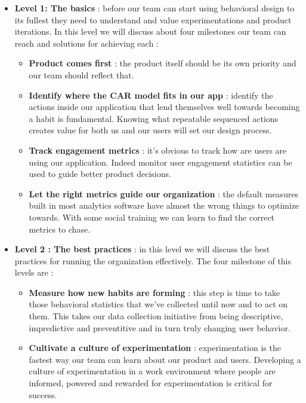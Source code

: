 \documentclass[11pt]{article}
\begin{document}
\begin{itemize}
\item \textbf{Level 1: The basics} : before our team can start using behavioral design to its fullest they need to understand and value experimentations and product iterations. In this level we will discuss about four milestones our team can reach and solutions for achieving each :
\begin{itemize}
\item \textbf{Product comes first} : the product itself should be its own priority and our team should reflect that.

\item \textbf{Identify where the CAR model fits in our app} : identify the actions inside our application that lend themselves well towards becoming a habit is fundamental. Knowing what repeatable sequenced actions creates value for both us and our users will set our design process.

\item \textbf{Track engagement metrics} : it's obvious to track how are users are using our application. Indeed monitor user engagement statistics can be used to guide better product decisions.

\item \textbf{Let the right metrics guide our organization} : the default measures built in most analytics software have almost the wrong things to optimize towards. With some social training we can learn to find the correct metrics to chase.
\end{itemize}

\item \textbf{Level 2 : The best practices} : in this level we will discuss the best practices for running the organization effectively. The four milestone of this levels are :
\begin{itemize}
\item \textbf{Measure how new habits are forming} : this step is time to take those behavioral statistics that we've collected until now and to act on them. This takes our data collection initiative from being descriptive, impredictive and preventitive and in turn truly changing user behavior.

\item \textbf{Cultivate a culture of experimentation} : experimentation is the fastest way our team can learn about our product and users. Developing a culture of experimentation in a work environment where people are informed, powered and rewarded for experimentation is critical for success.


\end{itemize}
\end{itemize}
\end{document}
